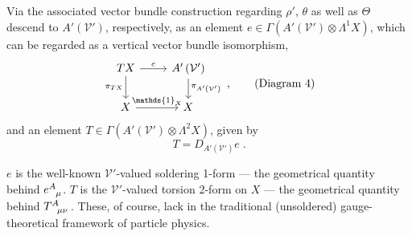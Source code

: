 \documentclass[../../main.tex]{subfiles}
\begin{document}
Via the associated vector bundle construction regarding $\rho'$, $\theta$ as well as $\Theta$ descend to $A'\left(\mathcal{V}'\right)$, respectively, as an element $e\in \Gamma \left(A'\left(\mathcal{V}'\right)\otimes \Lambda^1X\right)$, which can be regarded as a vertical vector bundle isomorphism,
\begin{equation}
  \label{dia:v-bundle_isomorphism}
  \begin{tikzcd}
    TX
    \arrow[r,"e"]
    \arrow[d,"\pi_{TX}" left]
    &
    A'\left(\mathcal{V}'\right)
    \arrow[d, "\pi_{A'\left(\mathcal{V'}\right)}" ]
    \\
    X
    \arrow[r, "\mathds{1}_X"]
    &
    X
  \end{tikzcd} \;, \tag{Diagram 4}
\end{equation}
and an element $T\in \Gamma \left(A'\left(\mathcal{V}'\right)\otimes \Lambda^2X\right)$, given by
\begin{equation}
  \label{eq:torsion_2form}
  T=D_{A'\left(\mathcal{V}'\right)}e \;.
\end{equation}

$e$ is the well-known $\mathcal{V}'$-valued soldering 1-form --- the geometrical quantity behind $\tensor{e}{^A_\mu}$. $T$ is the $\mathcal{V}'$-valued torsion 2-form on $X$ --- the geometrical quantity behind $\tensor{T}{^A_{\mu\nu}}$. These, of course, lack in the traditional (unsoldered) gauge-theoretical framework of particle physics.
\end{document}
